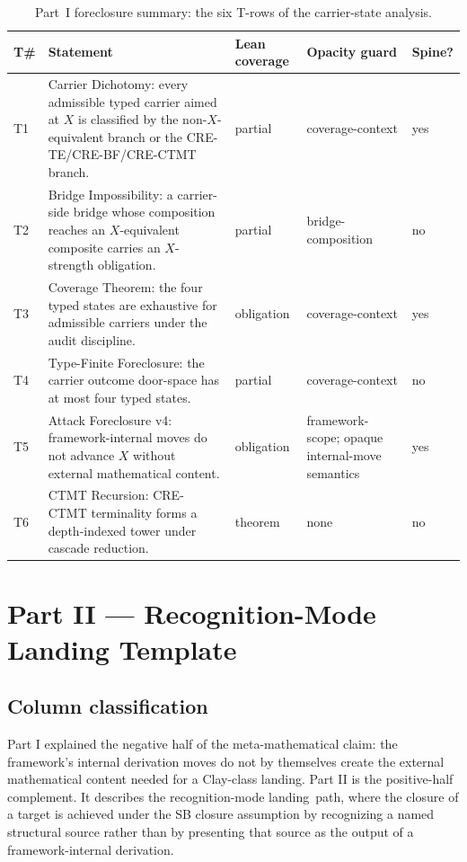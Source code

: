 \documentclass[11pt]{article}
\newcommand{\CRETE}{\textsc{CRE-TE}}
\newcommand{\CREBF}{\textsc{CRE-BF}}
\newcommand{\CRECTMT}{\textsc{CRE-CTMT}}
\newcommand{\RML}{recognition-mode landing}
\theoremstyle{definition}
\begin{document}
\begin{table}[H]
  \centering
  \caption{Part~I foreclosure summary: the six T-rows of the carrier-state analysis.}
  \label{tab:foreclosure:summary}
  \scriptsize
  \renewcommand{\arraystretch}{1.08}
  \begin{tabularx}{\textwidth}{@{}>{\raggedright\arraybackslash}p{}>{\raggedright\arraybackslash}X>{\raggedright\arraybackslash}p{}>{\raggedright\arraybackslash}p{}>{\centering\arraybackslash}p{}@{}}
    \toprule
    T\# & Statement & Lean coverage & Opacity guard & Spine? \\
    \midrule
    T1 & Carrier Dichotomy: every admissible typed carrier aimed at \(X\) is classified by the non-\(X\)-equivalent branch or the \CRETE/\CREBF/\CRECTMT{} branch. & partial & coverage-context & yes \\
    T2 & Bridge Impossibility: a carrier-side bridge whose composition reaches an \(X\)-equivalent composite carries an \(X\)-strength obligation. & partial & bridge-composition & no \\
    T3 & Coverage Theorem: the four typed states are exhaustive for admissible carriers under the audit discipline. & obligation & coverage-context & yes \\
    T4 & Type-Finite Foreclosure: the carrier outcome door-space has at most four typed states. & partial & coverage-context & no \\
    T5 & Attack Foreclosure v4: framework-internal moves do not advance \(X\) without external mathematical content. & obligation & framework-scope; opaque internal-move semantics & yes \\
    T6 & CTMT Recursion: \CRECTMT{} terminality forms a depth-indexed tower under cascade reduction. & theorem & none & no \\
    \bottomrule
  \end{tabularx}
\end{table}
  \section{Part II --- Recognition-Mode Landing Template}\label{sec:recognition}

\subsection{Column classification}\label{sec:recognition:column-classification}

Part I explained the negative half of the meta-mathematical claim: the
framework's internal derivation moves do not by themselves create the
external mathematical content needed for a Clay-class landing. Part II is
the positive-half complement. It describes the \RML\ path, where the
closure of a target is achieved under the SB closure assumption by
recognizing a named structural source rather than by presenting that source
as the output of a framework-internal derivation.
\end{document}
